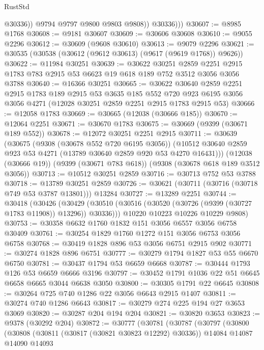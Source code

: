 \begin{lexlean}{RustStd}
\begin{coremodule}
                  @30336))
              @9794
              @9797
              @9800
              @9803
              @9808))
          @30336)))
@30607 := @8985 @1768
@30608 := @9181 @30607
@30609 := @30606 @30608
@30610 := @9055 @2296
@30612 := @30609 (@9608 @30610)
@30613 := @9079 @2296
@30621 := @30535 (@30538 (@30612 (@9612 @30613) (@9617 (@9619 @1768)) @9626))
@30622 := @11984 @30251
@30639 := @30622
    @30251
    @2859
    @2251
    @2915
    @1783
    @783
    @2915
    @53
    @6623
    @19
    @618
    @189
    @752
    @3512
    @3056
    @3056
    @3788
@30640 := @16366 @30251
@30665 := @30622
    @30640
    @2859
    @2251
    @2915
    @1783
    @189
    @2915
    @53
    @3635
    @185
    @552
    @720
    @923
    @6195
    @3056
    @3056
    @4271
    (@12028 @30251 @2859 @2251 @2915 @1783 @2915 @53)
@30666 := @12058 @1783
@30669 := @30665 (@12038 (@30666 @185))
@30670 := @12064 @2251
@30671 := @30670 @1783
@30675 := @30669 (@9399 (@30671 @189 @552))
@30678 := @12072 @30251 @2251 @2915
@30711 := @30639
    (@30675
      (@9308 (@30678 @552 @720 @6195 @3056))
      (@10512 @30640 @2859 @923 @53 @4271 (@13789 @30640 @2859 @920 @53 @4270 @16431)))
    (@12038 (@30666 @19))
    (@9399 (@30671 @783 @618))
    (@9308 (@30678 @618 @189 @3512 @3056))
@30713 := @10512 @30251 @2859
@30716 := @30713 @752 @53 @3788
@30718 := @13789 @30251 @2859
@30726 := @30621 (@30711 (@30716 (@30718 @749 @53 @3787 @13801))) @13284
@30727 := @13289 @2251
@30744 := @30418
    (@30426
      (@30429 (@30510 (@30516 (@30520 (@30726 (@9399 (@30727 @1783 @11908)) @13296)) @30336)))
      @10220
      @10223
      @10226
      @10229
      @9808)
@30753 := @30358 @6632 @1760 @1832 @151 @3056 @6557 @3056 @6758 @30409
@30761 := @30254 @1829 @1760 @1272 @151 @3056 @6753 @3056 @6758
@30768 := @30419 @1828 @896 @53 @3056 @6751 @2915 @902
@30771 := @30274 @1828 @896 @6751
@30777 := @30279 @1794 @1827 @53 @55 @6670 @6750
@30781 := @30437 @1794 @53 @6659 @6668
@30787 := @30444 @1793 @126 @53 @6659 @6666 @3196
@30797 := @30452 @1791 @1036 @22 @51 @6645 @6658 @6665 @3044 @6638 @3050
@30800 := @30305 @1791 @22 @6645
@30808 := @30264 @725 @740 @1286 @22 @3056 @6643 @2915 @1407
@30811 := @30274 @740 @1286 @6643
@30817 := @30279 @274 @225 @194 @27 @3653 @3069
@30820 := @30287 @204 @194 @204
@30821 := @30820 @3653
@30823 := @9378 (@30292 @204)
@30872 := @30777
    (@30781
      (@30787
        (@30797
          (@30800
            (@30808
              (@30811 (@30817 (@30821 @30823 @12292) @30336))
              @14084
              @14087
              @14090
              @14093

\end{coremodule}
\end{lexlean}
